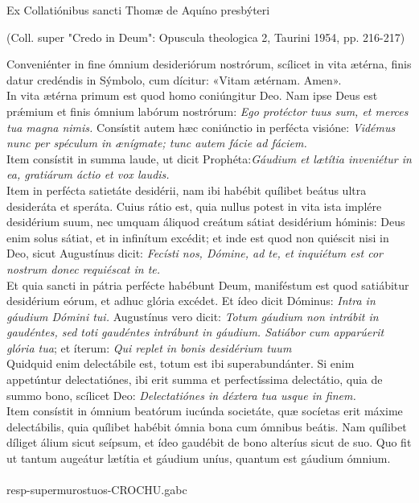 \documentclass[options]{article}
\begin{document}
	Ex Collatiónibus sancti Thomæ de Aquíno presbýteri
	\begin{flushright}
		(Coll. super "Credo in Deum": Opuscula theologica 2, Taurini 1954, pp. 216-217)
	\end{flushright}
Conveniénter in fine ómnium desideriórum nostrórum, scílicet in vita ætérna, finis datur credéndis in Sýmbolo, cum dícitur: «Vitam ætérnam. Amen».\\ 
In vita ætérna primum est quod homo coniúngitur Deo. Nam ipse Deus est pr\'{æ}mium et finis ómnium labórum nostrórum: \emph{Ego protéctor tuus sum, et merces tua magna nimis.} Consístit autem hæc coniúnctio in perfécta visióne: \emph{Vidémus nunc per spéculum in ænígmate; tunc autem fácie ad fáciem.}\\
Item consístit in summa laude, ut dicit Prophéta:\emph{Gáudium et lætítia inveniétur in ea, gratiárum áctio et vox laudis.}\\
  Item in perfécta satietáte desidérii, nam ibi habébit quílibet beátus ultra desideráta et speráta. Cuius rátio est, quia nullus potest in vita ista implére desidérium suum, nec umquam áliquod creátum sátiat desidérium hóminis: Deus enim solus sátiat, et in infinítum excédit; et inde est quod non quiéscit nisi in Deo, sicut Augustínus dicit: \emph{Fecísti nos, Dómine, ad te, et inquiétum est cor nostrum donec requiéscat in te.}\\
   Et quia sancti in pátria perfécte habébunt Deum, maniféstum est quod satiábitur desidérium eórum, et adhuc glória excédet. Et ídeo dicit Dóminus: \emph{Intra in gáudium Dómini tui.} Augustínus vero dicit: \emph{Totum gáudium non intrábit in gaudéntes, sed toti gaudéntes intrábunt in gáudium. Satiábor cum apparúerit glória tua}; et íterum: \emph{Qui replet in bonis desidérium tuum}\\
   Quidquid enim delectábile est, totum est ibi superabundánter. Si enim appetúntur delectatiónes, ibi erit summa et perfectíssima delectátio, quia de summo bono, scílicet Deo: \emph{Delectatiónes in déxtera tua usque in finem.}\\
    Item consístit in ómnium beatórum iucúnda societáte, quæ socíetas erit máxime delectábilis, quia quílibet habébit ómnia bona cum ómnibus beátis. Nam quílibet díliget álium sicut seípsum, et ídeo gaudébit de bono alteríus sicut de suo. Quo fit ut tantum augeátur lætítia et gáudium uníus, quantum est gáudium ómnium.\\
    \\
    resp-supermurostuos-CROCHU.gabc\\
    
\end{document}
